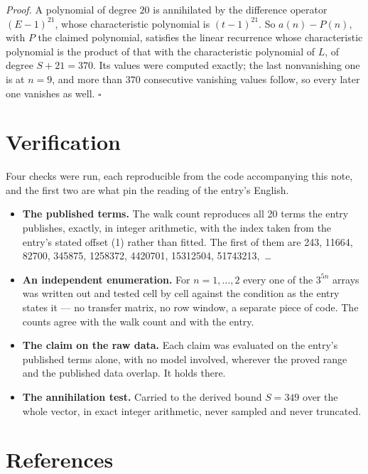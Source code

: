 \documentclass[11pt]{article}
\theoremstyle{definition}
\begin{document}
{\itshape Proof.} A polynomial of degree $20$ is annihilated by the difference operator $(E-1)^{21}$, whose characteristic polynomial is $(t-1)^{21}$. So $a(n) - P(n)$, with $P$ the claimed polynomial, satisfies the linear recurrence whose characteristic polynomial is the product of that with the characteristic polynomial of $L$, of degree $S + 21 = 370$. Its values were computed exactly; the last nonvanishing one is at $n = 9$, and more than $370$ consecutive vanishing values follow, so every later one vanishes as well. $\square$

\section{Verification}

Four checks were run, each reproducible from the code accompanying this note, and the first two are what pin the reading of the entry's English.

\begin{itemize}

\item {\bfseries The published terms.} The walk count reproduces all 20 terms the entry publishes, exactly, in integer arithmetic, with the index taken from the entry's stated offset (1) rather than fitted. The first of them are 243, 11664, 82700, 345875, 1258372, 4420701, 15312504, 51743213,~\dots

\item {\bfseries An independent enumeration.} For $n = 1,\dots,2$ every one of the $3^{5n}$ arrays was written out and tested cell by cell against the condition as the entry states it --- no transfer matrix, no row window, a separate piece of code. The counts agree with the walk count and with the entry.

\item {\bfseries The claim on the raw data.} Each claim was evaluated on the entry's published terms alone, with no model involved, wherever the proved range and the published data overlap. It holds there.

\item {\bfseries The annihilation test.} Carried to the derived bound $S = 349$ over the whole vector, in exact integer arithmetic, never sampled and never truncated.

\end{itemize}

\section{References}
\end{document}
